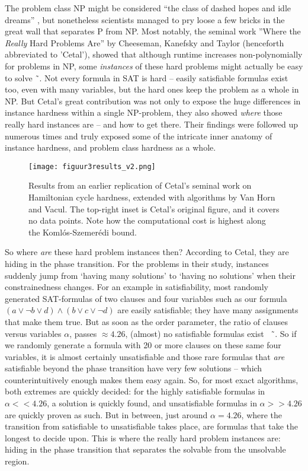 \documentclass[10pt,conference,compsocconf]{IEEEtran}
\begin{document}
The problem class NP might be considered ``the class of dashed hopes and idle dreams'' \cite{dashed}, but nonetheless scientists managed to pry loose a few bricks in the great wall that separates P from NP. Most notably, the seminal work ''Where the \textit{Really} Hard Problems Are'' by Cheeseman, Kanefsky and Taylor (henceforth abbreviated to 'Cetal'), showed that although runtime increases non-polynomially for problems in NP, some \textit{instances} of these hard problems might actually be easy to solve ˜\cite{cheeseman1991really}. Not every formula in SAT is hard -- easily satisfiable formulas exist too, even with many variables, but the hard ones keep the problem as a whole in NP. But Cetal's great contribution was not only to expose the huge differences in instance hardness within a single NP-problem, they also showed \textit{where} those really hard instances are -- and how to get there. Their findings were followed up numerous times and truly exposed some of the intricate inner anatomy of instance hardness, and problem class hardness as a whole.

\begin{figure*}[h]
\centering%
\texttt{[image: figuur3results\_v2.png]} 
\caption{Results from an earlier replication of Cetal's seminal work on Hamiltonian cycle hardness, extended with algorithms by Van Horn and Vacul. The top-right inset is Cetal’s original figure, and it covers no data points. Note how the computational cost is highest along the Koml\'os-Szemer\'edi bound.}
\label{fig:vanhornsresults}
\end{figure*}


So where \textit{are} these hard problem instances then? According to Cetal, they are hiding in the phase transition. For the problems in their study, instances suddenly jump from `having many solutions' to `having no solutions' when their constrainedness changes. For an example in satisfiability, most randomly generated SAT-formulas of two clauses and four variables such as our formula $( a \lor \lnot b \lor d ) \land ( b \lor c \lor \lnot d )$  are easily satisfiable; they have many assignments that make them true. But as soon as the order parameter, the ratio of clauses versus variables $\alpha$, passes $\approx 4.26$, (almost) no satisfiable formulas exist ~\cite{larrabee1992evidence}˜\cite{kirkpatrick1994critical}. So if we randomly generate a formula with 20 or more clauses on these same four variables, it is almost certainly unsatisfiable and those rare formulas that \textit{are} satisfiable beyond the phase transition have very few solutions -- which counterintuitively enough makes them easy again. So, for most exact algorithms, both extremes are quickly decided: for the highly satisfiable formulas in $\alpha<< 4.26$, a solution is quickly found, and unsatisfiable formulas in $\alpha>> 4.26$ are quickly proven as such. But in between, just around $\alpha = 4.26$, where the transition from satisfiable to unsatisfiable takes place, are formulas that take the longest to decide upon. This is where the really hard problem instances are: hiding in the phase transition that separates the solvable from the unsolvable region. 
\end{document}
